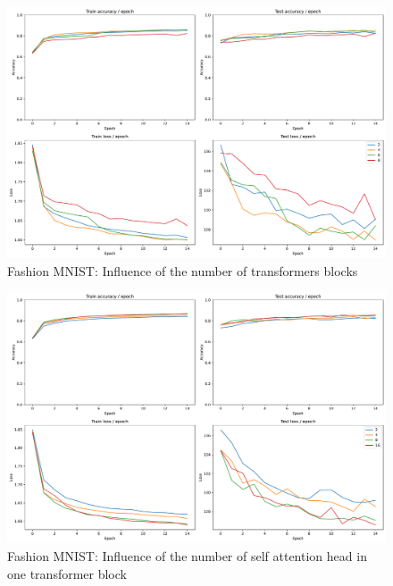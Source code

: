 \begin{figure}[H]
    \centering
    \includegraphics*[width=\textwidth]{figs/Transformers/fashion-MNIST/nb_block_influence.pdf}
    \caption{Fashion MNIST: Influence of the number of transformers blocks}
    \label{fig:fashion:nb_block_influence}
\end{figure}

\begin{figure}[H]
    \centering
    \includegraphics*[width=\textwidth]{figs/Transformers/fashion-MNIST/num_heads_influence.pdf}
    \caption{Fashion MNIST: Influence of the number of self attention head in one transformer block }
    \label{fig:fashion:num_heads_influence}
\end{figure}

